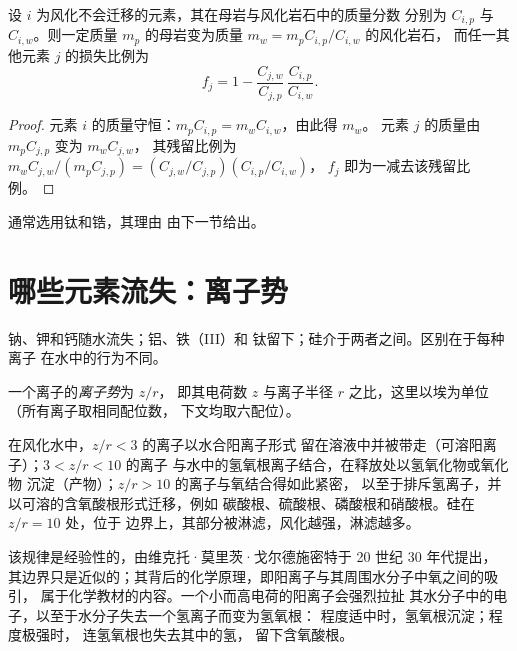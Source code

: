 \begin{proposition}[不移动元素的质量平衡]\label{prop:b1:weathering-clays:immobile}
设 $i$ 为风化不会迁移的元素，其在母岩与风化岩石中的质量分数
分别为 $C_{i,p}$ 与 $C_{i,w}$。则一定质量
$m_p$ 的母岩变为质量 $m_w = m_p C_{i,p}/C_{i,w}$ 的风化岩石，
而任一其他元素 $j$ 的损失比例为
\[
  f_j = 1 - \frac{C_{j,w}}{C_{j,p}}\,\frac{C_{i,p}}{C_{i,w}} .
\]
\end{proposition}

\begin{proof}
元素 $i$ 的质量守恒：$m_p C_{i,p} = m_w C_{i,w}$，由此得 $m_w$。
元素 $j$ 的质量由 $m_p C_{j,p}$ 变为 $m_w C_{j,w}$，
其残留比例为 $m_w C_{j,w}/(m_p C_{j,p}) = (C_{j,w}/C_{j,p})(C_{i,p}/C_{i,w})$，
$f_j$ 即为一减去该残留比例。
\end{proof}

通常选用钛和锆，其理由
由下一节给出。

\section{哪些元素流失：离子势}\label{sec:b1:weathering-clays:ionic}

钠、钾和钙随水流失；铝、铁（III）和
钛留下；硅介于两者之间。区别在于每种离子
在水中的行为不同。

\begin{definition}[离子势]\label{def:b1:weathering-clays:ionic-potential}
一个离子的\emph{离子势}为 $z/r$，
即其电荷数 $z$ 与离子半径 $r$ 之比，这里以埃为单位（所有离子取相同配位数，
下文均取六配位）。
\end{definition}

\begin{proposition}[离子势的三个区间]\label{prop:b1:weathering-clays:fields}
在风化水中，$z/r < 3$ 的离子以水合阳离子形式
留在溶液中并被带走（可溶阳离子）；$3 < z/r < 10$ 的离子
与水中的氢氧根离子结合，在释放处以氢氧化物或氧化物
沉淀（产物）；$z/r > 10$ 的离子与氧结合得如此紧密，
以至于排斥氢离子，并以可溶的含氧酸根形式迁移，例如
碳酸根、硫酸根、磷酸根和硝酸根。硅在 $z/r = 10$ 处，位于
边界上，其部分被淋滤，风化越强，淋滤越多。
\end{proposition}
\admitted

该规律是经验性的，由维克托·莫里茨·戈尔德施密特于 20 世纪 30 年代提出，
其边界只是近似的；其背后的化学原理，即阳离子与其周围水分子中氧之间的吸引，
属于化学教材的内容。一个小而高电荷的阳离子会强烈拉扯
其水分子中的电子，以至于水分子失去一个氢离子而变为氢氧根：
程度适中时，氢氧根沉淀；程度极强时，
连氢氧根也失去其中的氢，
留下含氧酸根。


